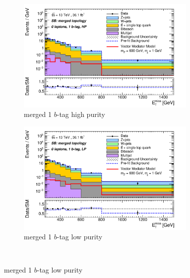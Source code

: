 \begin{figure}[htbp]
  \begin{subfigure}{0.49\textwidth}
    \centering
    \includegraphics[width=0.95\textwidth]{figures/monoV/postfit/monoV_0lep_1tag_merged_substrPass_massFail_met_XS.pdf}
    \caption{merged 1 \(b\)-tag high purity}
  \end{subfigure}
  \begin{subfigure}{0.49\textwidth}
    \centering
    \includegraphics[width=0.95\textwidth]{figures/monoV/postfit/monoV_0lep_1tag_merged_substrFail_massFail_met_XS.pdf}
    \caption{merged 1 \(b\)-tag low purity}
  \end{subfigure} \\


\end{figure}
